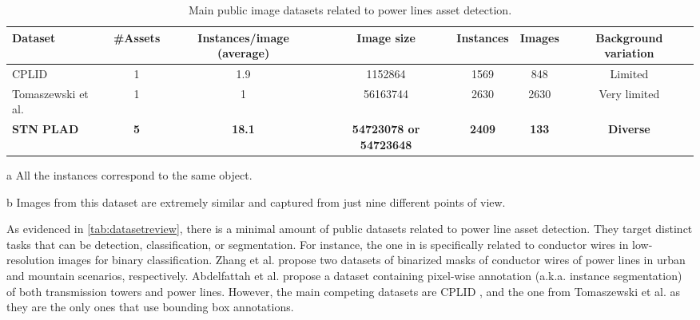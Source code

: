 \documentclass[10pt,conference]{IEEEtran}
\begin{document}
\begin{table*}[htbp]
 \caption{Main public image datasets related to power lines asset detection. }
 \centering
   \begin{threeparttable}
\begin{tabular}{lcccccc}
\toprule
Dataset                                                              & \#Assets                    & Instances/image (average)      & Image size                                                     & Instances & Images & Background variation              \\
\midrule
CPLID \cite{tao2018cplid}                           & 1                           & 1.9                            & 1152864                                                & 1569                          & 848                        & Limited                           \\
Tomaszewski et al. \cite{tomaszewski2018collection} & 1                           & 1                              & 56163744                                               & 2630\tnote{a}                         & 2630\tnote{b}                      & Very limited                      \\
\textbf{STN PLAD}                                      & \textbf{5} & \textbf{18.1} & \textbf{54723078 or 54723648} & \textbf{2409}                          & \textbf{133}                        & \textbf{Diverse} \\ 
\bottomrule
\end{tabular}
  \begin{tablenotes}
  \item[a] All the instances correspond to the same object.
  \item[b] Images from this dataset are extremely similar and captured from just nine different points of view.
  \end{tablenotes}
  \end{threeparttable}
  \label{tab:datasetreview}
\end{table*}


As evidenced in \autoref{tab:datasetreview}, there is a minimal amount of public datasets related to power line asset detection. They target distinct tasks that can be detection, classification, or segmentation. For instance, the one in \cite{emre2017powerline} is specifically related to conductor wires in low-resolution images for binary classification. Zhang et al. \cite{zhang2019detecting} propose two datasets of binarized masks of conductor wires of power lines in urban and mountain scenarios, respectively. Abdelfattah et al. \cite{abdelfattah2020ttpla} propose a dataset containing pixel-wise annotation (a.k.a. instance segmentation) of both transmission towers and power lines. However, the main competing datasets are CPLID \cite{tao2018cplid}, and the one from Tomaszewski et al. \cite{tomaszewski2018collection} as they are the only ones that use bounding box annotations.
\end{document}
